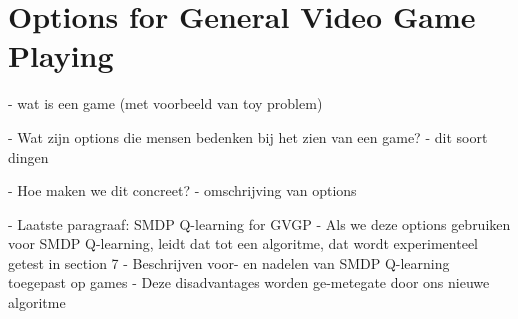 \chapter{Options for General Video Game Playing}

- wat is een game (met voorbeeld van toy problem)

- Wat zijn options die mensen bedenken bij het zien van een game?
	- dit soort dingen

- Hoe maken we dit concreet?
	- omschrijving van options

- Laatste paragraaf: SMDP Q-learning for GVGP
	- Als we deze options gebruiken voor SMDP Q-learning, leidt dat tot een algoritme, dat wordt experimenteel getest in section 7
	- Beschrijven voor- en nadelen van SMDP Q-learning toegepast op games
		- Deze disadvantages worden ge-metegate door ons nieuwe algoritme
